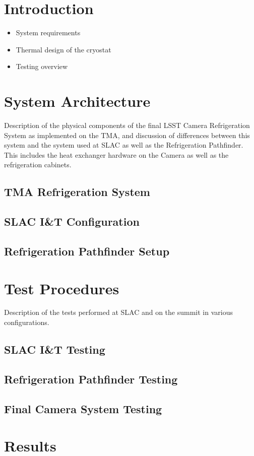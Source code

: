 \section{Introduction}

\begin{itemize}
	\item System requirements
	\item Thermal design of the cryostat
	\item Testing overview
\end{itemize}

 
\section{System Architecture} 

Description of the physical components of the final LSST Camera Refrigeration System as implemented on the TMA, and discussion of differences between this system and the system used at SLAC as well as the Refrigeration Pathfinder. This includes the heat exchanger hardware on the Camera as well as the refrigeration cabinets.

\subsection{TMA Refrigeration System} 
\subsection{SLAC I\&T Configuration}
\subsection{Refrigeration Pathfinder Setup}

\vspace{5mm}
\section{Test Procedures} 

Description of the tests performed at SLAC and on the summit in various configurations.

\subsection{SLAC I\&T Testing}
\subsection{Refrigeration Pathfinder Testing}
\subsection{Final Camera System Testing} 

\vspace{5mm}
\section{Results}
